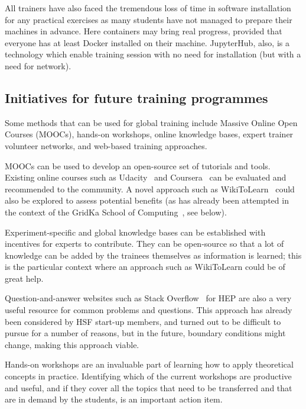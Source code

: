 \documentclass[12pt,a4paper]{article}
\begin{document}
All trainers have also faced the tremendous loss of time
in software installation for any practical exercises as many students have
not managed to prepare their machines in advance.
Here containers may bring real
progress, provided that everyone has at least Docker\cite{Docker} installed on
their machine.
JupyterHub\cite{JupyterHub}, also, is a technology which enable training session
with no need for installation (but with a need for network).

\subsection{Initiatives for future training programmes\label{sec:initiatives}} 

Some methods that can be used for global training include Massive Online Open
Courses (MOOCs), hands-on workshops, online knowledge bases, expert trainer volunteer
networks, and web-based training approaches.

MOOCs can be used to develop an open-source set of
tutorials and tools. Existing online courses such as Udacity~\cite{Udacity} and 
Coursera~\cite{Coursera} can be
evaluated and recommended to the community. A novel approach such as WikiToLearn~\cite{WikiToLearn}
could also be explored to assess potential benefits (as has already been attempted
in the context of the GridKa School of Computing~\cite{GridKa}, see below).

Experiment-specific and global knowledge bases can be established with
incentives for experts to contribute. They can be open-source so that a lot of
knowledge can be added by the trainees themselves as information is learned;
this is the particular context where an approach such as WikiToLearn could be
of great help.

Question-and-answer websites such as Stack Overflow~\cite{Stackoverflow} for HEP are also a very
useful resource for common problems and questions. This approach has already
been considered by HSF start-up members, and turned out to be difficult to
pursue for a number of reasons, but in the future, boundary conditions might
change, making this approach viable.

Hands-on workshops are an invaluable part of learning how to apply theoretical
concepts in practice. Identifying which of the current workshops are productive
and useful, and if they cover all the topics that need to be transferred and
that are in demand by the students, is an important action item.
\end{document}
